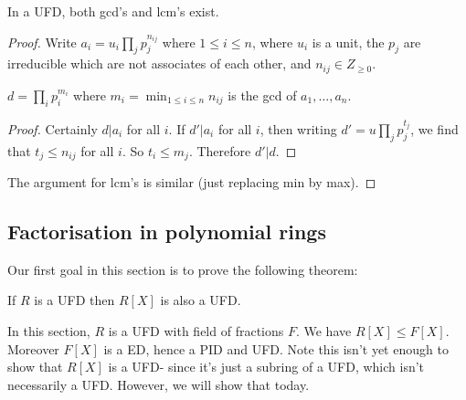 \documentclass[egregdoesnotlikesansseriftitles,a4paper]{scrartcl}
\begin{document}
\begin{proposition}
       In a UFD, both gcd's and lcm's exist.
       \begin{proof}
            Write $a_i = u_i \prod_{j}p_{j}^{n_{ij}}$ where $1 \leq i \leq n$, where $u_{i}$ is a unit, the $p_{j}$ are irreducible which are not associates of each other, and $n_{ij}\in Z_{\geq 0}$. 
            \begin{claim}
                  $d=\prod_{i}{p_{i}^{m_i}}$ where $m_i=\min_{1 \leq i \leq n} n_{ij}$ is the gcd of $a_1 , \ldots, a_n$.
            \end{claim}
            \begin{proof}
                  Certainly $d| a_{i}$ for all $i$. If $d'|a_{i}$ for all $i$, then writing $d'=u \prod_j p_{j}^{t_{j}} $, we find that $t_{j}\leq n_{ij}$ for all $i$. So $t_i \leq m_j$. Therefore $d' |d$. 
            \end{proof}
            The argument for lcm's is similar (just replacing min by max).
     \end{proof}
\end{proposition}
\subsection{Factorisation in polynomial rings}
\begin{goal}
      Our first goal in this section is to prove the following theorem:
\end{goal}
\begin{theorem}\label{polyUFD}
       If $R$ is a UFD then $R[X]$ is also a UFD.
\end{theorem}
In this section, $R$ is a UFD with field of fractions $F$. We have $R[X] \leq F[X]$. Moreover $F[X]$ is a ED, hence a PID and UFD. Note this isn't yet enough to show that $R[X]$ is a UFD- since it's just a subring of a UFD, which isn't necessarily a UFD. However, we will show that today.
\end{document}
